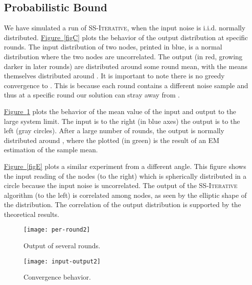 \documentclass[preprint,12pt]{elsarticle}
\newcommand{\namedref}[2]{\hyperref[#2]{#1~\ref*{#2}}}
\newcommand{\figureref}[1]{\namedref{Figure}{#1}}
\newcommand{\syncAlg}{\textsc{SS-Iterative}\xspace}
\begin{document}
\subsection{Probabilistic Bound}
We have simulated a run of \syncAlg, when the input noise is i.i.d. normally distributed.
\figureref{figC} plots the behavior of the output distribution at specific rounds. The input distribution of two nodes, printed in blue, is a normal distribution where the two nodes are uncorrelated. The output (in red, growing darker in later rounds) are distributed around some round mean, with the means themselves distributed around . It is important to note there is no greedy convergence to . This is because each round contains a different noise sample and thus at a specific round our solution can stray away from .

\figureref{figD} plots the behavior of the mean value of the input and output to the large system limit. The input
 is to the right (in blue axes) the output is to the left (gray circles). After a large number of rounds, the output is normally distributed around , where the plotted  (in green) is the result of an EM estimation of the sample mean.

\figureref{figE} plots a similar experiment from a different angle. 
This figure shows the input reading of the nodes (to the right) which is spherically distributed in a circle because the input noise is uncorrelated. The output of the \syncAlg algorithm (to the left) is correlated among nodes, as seen by the elliptic shape of the distribution. The correlation of the output distribution is supported by the theoretical results.

\begin{figure}[h!]
\begin{minipage}[b]{0.5\linewidth}
\centering
  \hspace{1.25in} \texttt{[image: per-round2]}
  \vspace{-0.5cm}
  \caption{Output of several rounds.}
  \label{figC}
\end{minipage}
\begin{minipage}[b]{0.5\linewidth}
\centering
  \hspace{1.25in} \texttt{[image: input-output2]}
  \vspace{-0.5cm}
  \caption{Convergence behavior.}
  \label{figD}
\end{minipage}
\end{figure}

\begin{figure}[h!]
\end{figure}
\end{document}
